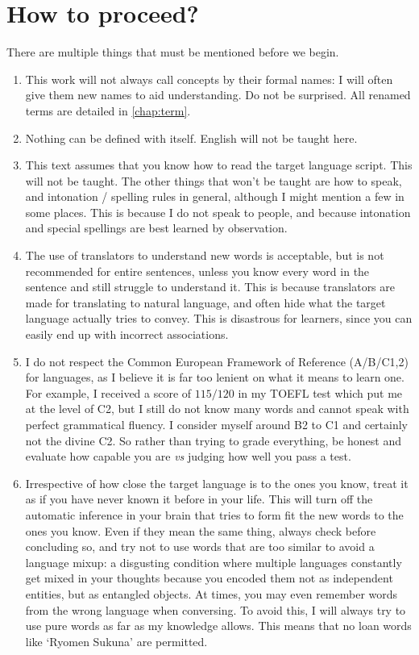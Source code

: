 \section{How to proceed?} 
There are multiple things that must be mentioned before we begin.
\begin{enumerate}
    \item This work will not always call concepts by their formal names: I will often give them new names to aid understanding. Do not be surprised. All renamed terms are detailed in \autoref{chap:term}.
    \item Nothing can be defined with itself. English will not be taught here.
    \item This text assumes that you know how to read the target language script. This will not be taught. The other things that won't be taught are how to speak, and intonation / spelling rules in general, although I might mention a few in some places. This is because I do not speak to people, and because intonation and special spellings are best learned by observation.
    \item The use of translators to understand new words is acceptable, but is not recommended  for entire sentences, unless you know every word in the sentence and still struggle to understand it. This is because translators are made for translating to natural language, and often hide what the target language actually tries to convey. This is disastrous for learners, since you can easily end up with incorrect associations.
    \item I do not respect the Common European Framework of Reference (A/B/C1,2) for languages, as I believe it is far too lenient on what it means to learn one. For example, I received a score of $115/120$ in my TOEFL test which put me at the level of C2, but I still do not know many words and cannot speak with perfect grammatical fluency. I consider myself around B2 to C1 and certainly not the divine C2. So rather than trying to grade everything, be honest and evaluate how capable you are \textit{vs} judging how well you pass a test.
    \item Irrespective of how close the target language is to the ones you know, treat it as if you have never known it before in your life. This will turn off the automatic inference in your brain that tries to form fit the new words to the ones you know. Even if they mean the same thing, always check before concluding so, and try not to use words that are too similar to avoid a language mixup: a disgusting condition where multiple languages constantly get mixed in your thoughts because you encoded them not as independent entities, but as entangled objects. At times, you may even remember words from the wrong language when conversing. To avoid this, I will always try to use pure words as far as my knowledge allows. This means that no loan words like `Ryomen Sukuna' are permitted.

\end{enumerate}
